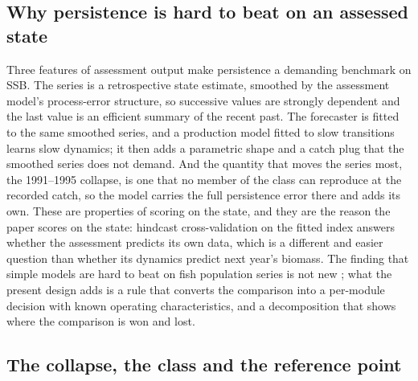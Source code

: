 \subsection{Why persistence is hard to beat on an assessed state}\label{sec:whypersist}

Three features of assessment output make persistence a demanding benchmark on SSB. The series is a retrospective state estimate, smoothed by the assessment model's process-error structure, so successive values are strongly dependent and the last value is an efficient summary of the recent past. The forecaster is fitted to the same smoothed series, and a production model fitted to slow transitions learns slow dynamics; it then adds a parametric shape and a catch plug that the smoothed series does not demand. And the quantity that moves the series most, the 1991--1995 collapse, is one that no member of the class can reproduce at the recorded catch, so the model carries the full persistence error there and adds its own. These are properties of scoring on the state, and they are the reason the paper scores on the state: hindcast cross-validation on the fitted index \citep{Kell2016,Kell2021,Carvalho2021} answers whether the assessment predicts its own data, which is a different and easier question than whether its dynamics predict next year's biomass. The finding that simple models are hard to beat on fish population series is not new \citep{Ward2014,Perretti2013}; what the present design adds is a rule that converts the comparison into a per-module decision with known operating characteristics, and a decomposition that shows where the comparison is won and lost.

\subsection{The collapse, the class and the reference point}\label{sec:classrp}

